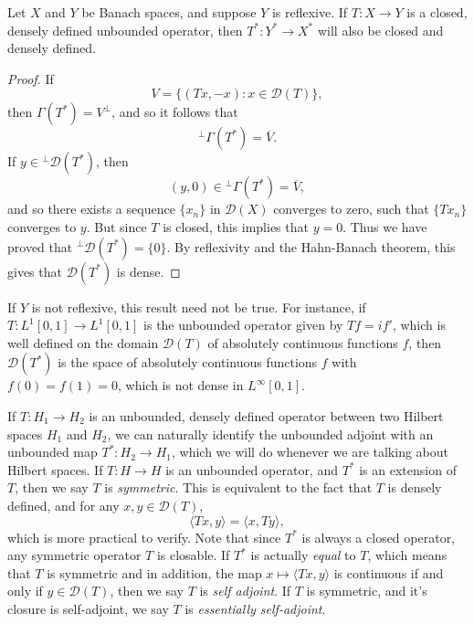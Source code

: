 %
%

\begin{lemma}
    Let $X$ and $Y$ be Banach spaces, and suppose $Y$ is reflexive. If $T: X \to Y$ is a closed, densely defined unbounded operator, then $T^*: Y^* \to X^*$ will also be closed and densely defined.
\end{lemma}
\begin{proof}
    If
    \[ V = \{ (Tx,-x): x \in \mathcal{D}(T) \}, \]
    then $\Gamma(T^*) = V^\perp$, and so it follows that
    \[ {}^\perp \Gamma(T^*) = \overline{V}. \]
    If $y \in {}^\perp \mathcal{D}(T^*)$, then
    \[ (y,0) \in {}^\perp \Gamma(T^*) = \overline{V}, \]
    and so there exists a sequence $\{ x_n \}$ in $\mathcal{D}(X)$ converges to zero, such that $\{ Tx_n \}$ converges to $y$. But since $T$ is closed, this implies that $y = 0$. Thus we have proved that ${}^\perp \mathcal{D}(T^*) = \{ 0 \}$. By reflexivity and the Hahn-Banach theorem, this gives that $\mathcal{D}(T^*)$ is dense.
\end{proof}

\begin{remark}
    If $Y$ is not reflexive, this result need not be true. For instance, if $T: L^1[0,1] \to L^1[0,1]$ is the unbounded operator given by $Tf = if'$, which is well defined on the domain $\mathcal{D}(T)$ of absolutely continuous functions $f$, then $\mathcal{D}(T^*)$ is the space of absolutely continuous functions $f$ with $f(0) = f(1) = 0$, which is not dense in $L^\infty[0,1]$.
\end{remark}

If $T: H_1 \to H_2$ is an unbounded, densely defined operator between two Hilbert spaces $H_1$ and $H_2$, we can naturally identify the unbounded adjoint with an unbounded map $T^*: H_2 \to H_1$, which we will do whenever we are talking about Hilbert spaces. If $T: H \to H$ is an unbounded operator, and $T^*$ is an extension of $T$, then we say $T$ is \emph{symmetric}. This is equivalent to the fact that $T$ is densely defined, and for any $x,y \in \mathcal{D}(T)$,
%
\[ \langle Tx, y \rangle = \langle x, Ty \rangle, \]
%
which is more practical to verify. Note that since $T^*$ is always a closed operator, any symmetric operator $T$ is closable. If $T^*$ is actually \emph{equal} to $T$, which means that $T$ is symmetric and in addition, the map $x \mapsto \langle Tx, y \rangle$ is continuous if and only if $y \in \mathcal{D}(T)$, then we say $T$ is \emph{self adjoint}. If $T$ is symmetric, and it's closure is self-adjoint, we say $T$ is \emph{essentially self-adjoint}.

